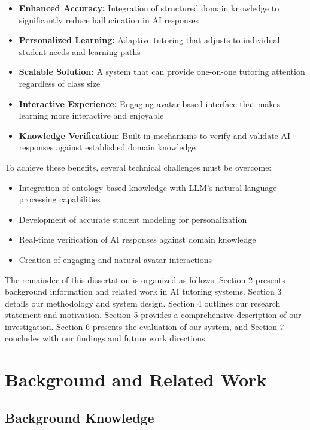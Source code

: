 \documentclass[a4paper,11pt,oneside]{article}
\begin{document}
  \begin{itemize}
    \item \textbf{Enhanced Accuracy:} Integration of structured domain knowledge to significantly reduce hallucination in AI responses
    \item \textbf{Personalized Learning:} Adaptive tutoring that adjusts to individual student needs and learning paths
    \item \textbf{Scalable Solution:} A system that can provide one-on-one tutoring attention regardless of class size
    \item \textbf{Interactive Experience:} Engaging avatar-based interface that makes learning more interactive and enjoyable
    \item \textbf{Knowledge Verification:} Built-in mechanisms to verify and validate AI responses against established domain knowledge
  \end{itemize}

  To achieve these benefits, several technical challenges must be overcome:
  \begin{itemize}
    \item Integration of ontology-based knowledge with LLM's natural language processing capabilities
    \item Development of accurate student modeling for personalization
    \item Real-time verification of AI responses against domain knowledge
    \item Creation of engaging and natural avatar interactions
  \end{itemize}

  The remainder of this dissertation is organized as follows: Section 2 presents background information and related work in AI tutoring systems. 
  Section 3 details our methodology and system design. Section 4 outlines our research statement and motivation. Section 5 provides a comprehensive 
  description of our investigation. Section 6 presents the evaluation of our system, and Section 7 concludes with our findings and future work directions.

  \section{Background and Related Work}

  \subsection{Background Knowledge}
\end{document}
